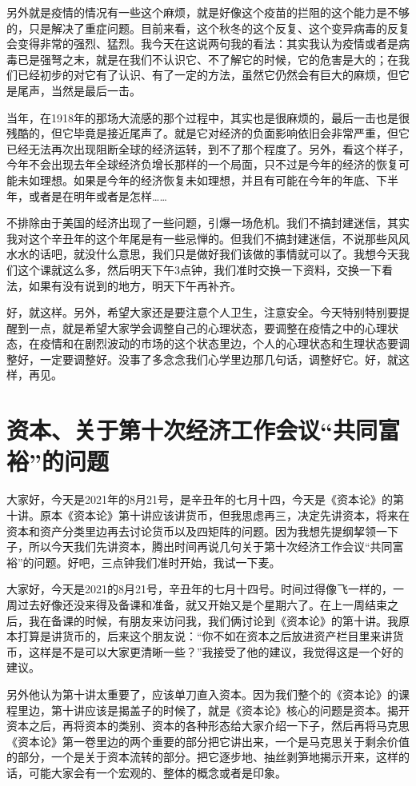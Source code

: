\documentclass[UTF8, 12pt, a4paper]{ctexrep}
\begin{document}
另外就是疫情的情况有一些这个麻烦，就是好像这个疫苗的拦阻的这个能力是不够的，只是解决了重症问题。目前来看，这个秋冬的这个反复、这个变异病毒的反复会变得非常的强烈、猛烈。我今天在这说两句我的看法：其实我认为疫情或者是病毒已是强弩之末，就是在我们不认识它、不了解它的时候，它的危害是大的；在我们已经初步的对它有了认识、有了一定的方法，虽然它仍然会有巨大的麻烦，但它是尾声，当然是最后一击。

当年，在1918年的那场大流感的那个过程中，其实也是很麻烦的，最后一击也是很残酷的，但它毕竟是接近尾声了。就是它对经济的负面影响依旧会非常严重，但它已经无法再次出现阻断全球的经济运转，到不了那个程度了。另外，看这个样子，今年不会出现去年全球经济负增长那样的一个局面，只不过是今年的经济的恢复可能未如理想。如果是今年的经济恢复未如理想，并且有可能在今年的年底、下半年，或者是在明年或者是怎样……

不排除由于美国的经济出现了一些问题，引爆一场危机。我们不搞封建迷信，其实我对这个辛丑年的这个年尾是有一些忌惮的。但我们不搞封建迷信，不说那些风风水水的话吧，就没什么意思，我们只是做好我们该做的事情就可以了。我想今天我们这个课就这么多，然后明天下午3点钟，我们准时交换一下资料，交换一下看法，如果有没有说到的地方，明天下午再补齐。

好，就这样。另外，希望大家还是要注意个人卫生，注意安全。今天特别特别要提醒到一点，就是希望大家学会调整自己的心理状态，要调整在疫情之中的心理状态，在疫情和在剧烈波动的市场的这个状态里边，个人的心理状态和生理状态要调整好，一定要调整好。没事了多念念我们心学里边那几句话，调整好它。好，就这样，再见。

\section{资本、关于第十次经济工作会议“共同富裕”的问题}

大家好，今天是2021年的8月21号，是辛丑年的七月十四，今天是《资本论》的第十讲。原本《资本论》第十讲应该讲货币，但我思虑再三，决定先讲资本，将来在资本和资产分类里边再去讨论货币以及四矩阵的问题。因为我想先提纲挈领一下子，所以今天我们先讲资本，腾出时间再说几句关于第十次经济工作会议“共同富裕”的问题。好吧，三点钟我们准时开始，我试一下麦。

大家好，今天是2021的8月21号，辛丑年的七月十四号。时间过得像飞一样的，一周过去好像还没来得及备课和准备，就又开始又是个星期六了。在上一周结束之后，我在备课的时候，有朋友来访问我，我们俩讨论到《资本论》的第十讲。我原本打算是讲货币的，后来这个朋友说：“你不如在资本之后放进资产栏目里来讲货币，这样是不是可以大家更清晰一些？”我接受了他的建议，我觉得这是一个好的建议。

另外他认为第十讲太重要了，应该单刀直入资本。因为我们整个的《资本论》的课程里边，第十讲应该是揭盖子的时候了，就是《资本论》核心的问题是资本。揭开资本之后，再将资本的类别、资本的各种形态给大家介绍一下子，然后再将马克思《资本论》第一卷里边的两个重要的部分把它讲出来，一个是马克思关于剩余价值的部分，一个是关于资本流转的部分。把它逐步地、抽丝剥笋地揭示开来，这样的话，可能大家会有一个宏观的、整体的概念或者是印象。
\end{document}
